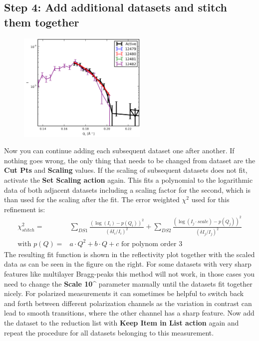   \subsection{Step 4: Add additional datasets and stitch them together}
    \begin{figure}
    \centering
     \includegraphics[width=175pt]{screenshots/stitching1.png} 
    \end{figure}
    Now you can continue adding each subsequent dataset one after another.
    If nothing goes wrong, the only thing that needs to be changed from dataset are the \textbf{Cut Pts} and \textbf{Scaling} values.
    If the scaling of subsequent datasets does not fit, activate the \textbf{Set Scaling action}  again. 
    This fits a polynomial to the logarithmic data of both adjacent datasets including a scaling factor for the second, which is than used for the scaling after the fit.
    The error weighted $\chi^2$ used for this refinement is:
    \begin{eqnarray*}
      \chi_{stitch}^2 =& \underset{DS1}{\sum} \frac{(\log(I_i)-p(Q_i))^2}{(\delta{}I_i/I_i)^2} + \underset{DS2}{\sum} \frac{(\log(I_j\cdot scale)-p(Q_j))^2}{(\delta{}I_j/I_j)^2} \\
      \text{with } p(Q) =& a\cdot Q^2 + b\cdot Q +c \text{ for polynom order 3}
    \end{eqnarray*}
    The resulting fit function is shown in the reflectivity plot together with the scaled data as can be seen in the figure on the right.
    For some datasets with very sharp features like multilayer Bragg-peaks this method will not work, in those cases you need to change the \textbf{Scale 10\^} parameter manually until the datasets fit together nicely.
    For polarized measurements it can sometimes be helpful to switch back and forth between different polarization channels as the variation in contrast can lead to smooth transitions, where the other channel has a sharp feature.
    Now add the dataset to the reduction list with \textbf{Keep Item in List action}  again and repeat the procedure for all datasets belonging to this measurement.


